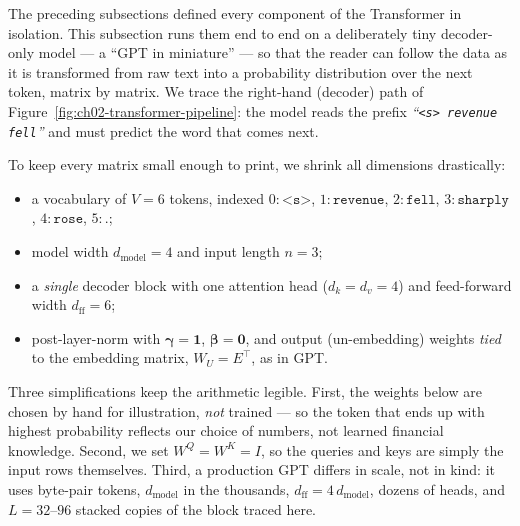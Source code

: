 \begin{deepdive}
The preceding subsections defined every component of the Transformer in isolation.
This subsection runs them end to end on a deliberately tiny decoder-only model --- a
``GPT in miniature'' --- so that the reader can follow the data as it is transformed
from raw text into a probability distribution over the next token, matrix by matrix.
We trace the right-hand (decoder) path of Figure~\ref{fig:ch02-transformer-pipeline}:
the model reads the prefix \textit{``\texttt{<s> revenue fell}''} and must predict the
word that comes next.

\begin{remark}
\label{rem:tinygpt-config}
To keep every matrix small enough to print, we shrink all dimensions drastically:
\begin{itemize}
  \item a vocabulary of $V = 6$ tokens, indexed
        $0\!:\!\texttt{<s>}$, $1\!:\!\texttt{revenue}$, $2\!:\!\texttt{fell}$,
        $3\!:\!\texttt{sharply}$, $4\!:\!\texttt{rose}$, $5\!:\!\texttt{.}$\;;
  \item model width $d_{\mathrm{model}} = 4$ and input length $n = 3$;
  \item a \emph{single} decoder block with one attention head
        ($d_k = d_v = 4$) and feed-forward width $d_{\mathrm{ff}} = 6$;
  \item post-layer-norm with $\boldsymbol{\gamma} = \mathbf{1}$,
        $\boldsymbol{\beta} = \mathbf{0}$, and output (un-embedding) weights
        \emph{tied} to the embedding matrix, $W_U = E^{\top}$, as in GPT.
\end{itemize}
Three simplifications keep the arithmetic legible.  First, the weights below are
chosen by hand for illustration, \emph{not} trained --- so the token that ends up
with highest probability reflects our choice of numbers, not learned financial
knowledge.  Second, we set $W^Q = W^K = I$, so the queries and keys are simply the
input rows themselves.  Third, a production GPT differs in scale, not in kind: it uses
byte-pair tokens, $d_{\mathrm{model}}$ in the thousands, $d_{\mathrm{ff}} = 4\,
d_{\mathrm{model}}$, dozens of heads, and $L = 32$--$96$ stacked copies of the block
traced here.
\end{remark}

\begingroup
\setlength{\arraycolsep}{3.5pt}


\end{deepdive}
